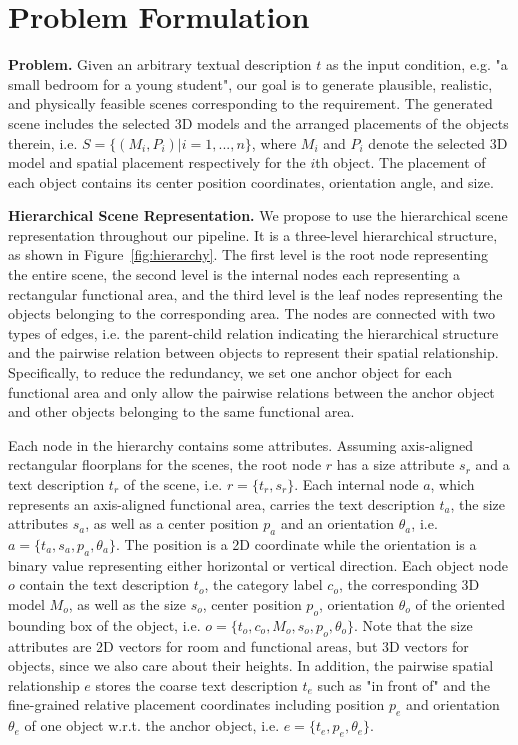 \section{Problem Formulation}

\noindent \textbf{Problem.} Given an arbitrary textual description $t$ as the input condition, e.g. "a small bedroom for a young student", our goal is to generate plausible, realistic, and physically feasible scenes corresponding to the requirement. The generated scene includes the selected 3D models and the arranged placements of the objects therein, i.e. $S=\{(M_i, P_i)|i=1,...,n\}$, where $M_i$ and $P_i$ denote the selected 3D model and spatial placement respectively for the $i$th object. The placement of each object contains its center position coordinates, orientation angle, and size.

\noindent \textbf{Hierarchical Scene Representation.} 
We propose to use the hierarchical scene representation throughout our pipeline. It is a three-level hierarchical structure, as shown in Figure~\ref{fig:hierarchy}. The first level is the root node representing the entire scene, the second level is the internal nodes each representing a rectangular functional area, and the third level is the leaf nodes representing the objects belonging to the corresponding area. The nodes are connected with two types of edges,
i.e. the parent-child relation indicating the hierarchical structure and the pairwise relation between objects to represent
their spatial relationship. Specifically, to reduce the redundancy, we set one anchor object for each functional area and only allow the pairwise relations between the anchor object and other objects belonging to the same functional area.

Each node in the hierarchy contains some attributes. Assuming axis-aligned rectangular floorplans for the scenes, the root node $r$ has a size attribute $s_r$ and a text description $t_r$ of the scene, i.e. $r = \{t_r, s_r\}$. Each internal node $a$, which represents an axis-aligned functional area, carries the text description $t_a$, the size attributes $s_a$, as well as a center position $p_a$ and an orientation $\theta_a$, i.e. $a = \{t_a, s_a, p_a, \theta_a\}$. The position is a 2D coordinate while the orientation is a binary value representing either horizontal or vertical direction. Each object node $o$ contain the text description $t_o$, the category label $c_o$, the corresponding 3D model $M_o$, as well as the size $s_o$, center position $p_o$, orientation $\theta_o$ of the oriented bounding box of the object, i.e. $o = \{t_o, c_o, M_o, s_o, p_o, \theta_o\}$. Note that the size attributes are 2D vectors for room and functional areas, but 3D vectors for objects, since we also care about their heights. In addition, the pairwise spatial relationship $e$ stores the coarse text description $t_e$ such as "in front of" and the fine-grained relative placement coordinates including position $p_e$ and orientation $\theta_e$ of one object w.r.t. the anchor object, i.e. $e = \{t_e, p_e, \theta_e\}$.